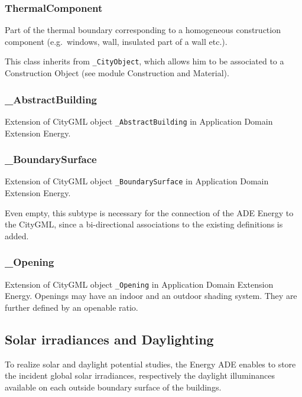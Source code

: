 \documentclass[a4paper,12pt]{article}
\begin{document}
\subsubsection{ThermalComponent}\label{thermalcomponent}

Part of the thermal boundary corresponding to a homogeneous construction
component (e.g.~windows, wall, insulated part of a wall etc.).

This class inherits from \texttt{\_CityObject}, which allows him to be
associated to a Construction Object (see module Construction and
Material).

\subsubsection{\_AbstractBuilding}\label{abstractbuilding}

Extension of CityGML object \texttt{\_AbstractBuilding} in Application
Domain Extension Energy.

\subsubsection{\_BoundarySurface}\label{boundarysurface}

Extension of CityGML object \texttt{\_BoundarySurface} in Application
Domain Extension Energy.

Even empty, this subtype is necessary for the connection of the ADE
Energy to the CityGML, since a bi-directional associations to the
existing definitions is added.

\subsubsection{\_Opening}\label{opening}

Extension of CityGML object \texttt{\_Opening} in Application Domain
Extension Energy. Openings may have an indoor and an outdoor shading
system. They are further defined by an openable ratio.

\subsection{Solar irradiances and
Daylighting}\label{solar-irradiances-and-daylighting}

To realize solar and daylight potential studies, the Energy ADE enables
to store the incident global solar irradiances, respectively the
daylight illuminances available on each outside boundary surface of the
buildings.
\end{document}
